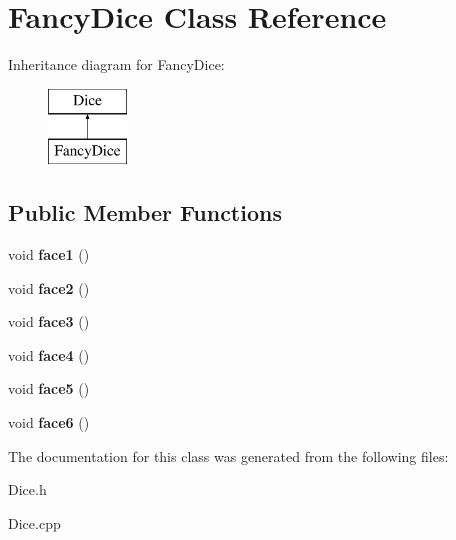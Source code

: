 \hypertarget{class_fancy_dice}{\section{Fancy\+Dice Class Reference}
\label{class_fancy_dice}
}
Inheritance diagram for Fancy\+Dice\+:\begin{figure}[H]
\begin{center}
\leavevmode
\includegraphics[height=2.000000cm]{class_fancy_dice}
\end{center}
\end{figure}
\subsection*{Public Member Functions}
\begin{DoxyCompactItemize}
\item 
\hypertarget{class_fancy_dice_aee1a0ad946b3a83693d61fdfefd15519}{void {\bfseries face1} ()}\label{class_fancy_dice_aee1a0ad946b3a83693d61fdfefd15519}

\item 
\hypertarget{class_fancy_dice_a30aa10cd3b5f645012f33e8e1531c9d9}{void {\bfseries face2} ()}\label{class_fancy_dice_a30aa10cd3b5f645012f33e8e1531c9d9}

\item 
\hypertarget{class_fancy_dice_ad6546af6fa0b63879717d7480367fe83}{void {\bfseries face3} ()}\label{class_fancy_dice_ad6546af6fa0b63879717d7480367fe83}

\item 
\hypertarget{class_fancy_dice_aa5bedabae1330f3fe52915906890c926}{void {\bfseries face4} ()}\label{class_fancy_dice_aa5bedabae1330f3fe52915906890c926}

\item 
\hypertarget{class_fancy_dice_a4de2b6d00791ad13a63c0c5c62d26ba8}{void {\bfseries face5} ()}\label{class_fancy_dice_a4de2b6d00791ad13a63c0c5c62d26ba8}

\item 
\hypertarget{class_fancy_dice_ae20e50b14a9e61fceefee7f12d18932e}{void {\bfseries face6} ()}\label{class_fancy_dice_ae20e50b14a9e61fceefee7f12d18932e}

\end{DoxyCompactItemize}


The documentation for this class was generated from the following files\+:\begin{DoxyCompactItemize}
\item 
Dice.\+h\item 
Dice.\+cpp\end{DoxyCompactItemize}
